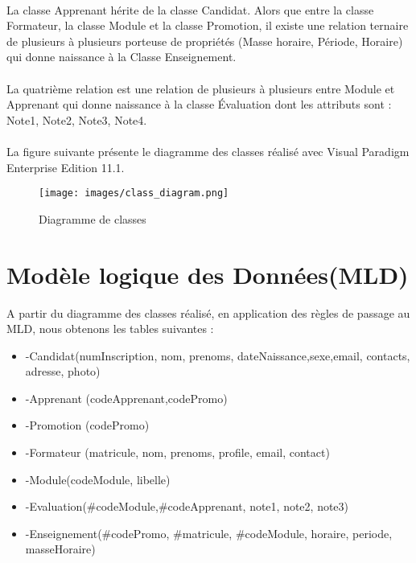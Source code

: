 \paragraph{}
La classe Apprenant hérite de la classe Candidat. Alors que entre la classe Formateur, la classe Module et la classe Promotion, il existe une relation ternaire de plusieurs à plusieurs porteuse de propriétés (Masse horaire, Période, Horaire) qui donne naissance à la Classe Enseignement.
\paragraph{} 
La quatrième relation est une relation de plusieurs à plusieurs entre Module et Apprenant qui donne naissance à la classe Évaluation dont les attributs sont : Note1, Note2, Note3, Note4.
\paragraph{}
La figure suivante présente le diagramme des classes réalisé avec Visual Paradigm Enterprise Edition 11.1.
\begin{figure}[H]
\begin{center}
	\texttt{[image: images/class\_diagram.png]}
	\caption{Diagramme de classes}
\end{center}
\end{figure}

\section{Modèle logique des Données(MLD)}
A partir du diagramme des classes réalisé, en application des règles de passage au MLD, nous obtenons les tables suivantes :
\newline
	\begin{itemize}
		\item{-}Candidat(numInscription, nom, prenoms, dateNaissance,sexe,email, contacts, adresse, photo)
		\item{-}Apprenant (codeApprenant,codePromo)
		\item{-}Promotion (codePromo)
		\item{-}Formateur (matricule, nom, prenoms, profile, email, contact)
		\item{-}Module(codeModule, libelle)
		\item{-}Evaluation(\#codeModule,\#codeApprenant, note1, note2, note3)
		\item{-}Enseignement(\#codePromo, \#matricule, \#codeModule, horaire, periode, masseHoraire)
	
	\end{itemize}
	


		

	



